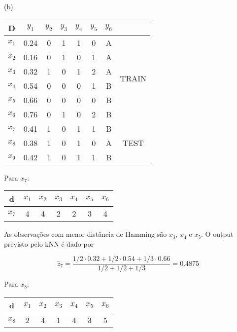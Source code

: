 \documentclass[a4paper,12pt]{article} %
\begin{document}
\begin{enumerate}
\begin{table}[H]
\end{table}

(b)

\begin{table}[H]
    \centering
    \begin{tabular}{cccccccc}
    D  & $y_1$   & $y_2$ & $y_3$ & $y_4$ & $y_5$ & $y_6$ &         \\ \hline
    $x_1$ & 0.24 & 0  & 1  & 1  & 0  & A  & \multirow{6}{*}{TRAIN} \\
    $x_2$ & 0.16 & 0  & 1  & 0  & 1  & A  &                        \\
    $x_3$ & 0.32 & 1  & 0  & 1  & 2  & A  &                        \\
    $x_4$ & 0.54 & 0  & 0  & 0  & 1  & B  &                        \\
    $x_5$ & 0.66 & 0  & 0  & 0  & 0  & B  &                        \\
    $x_6$ & 0.76 & 0  & 1  & 0  & 2  & B  &                        \\ \hline
    $x_7$ & 0.41 & 1  & 0  & 1  & 1  & B  & \multirow{3}{*}{TEST}  \\
    $x_8$ & 0.38 & 1  & 0  & 1  & 0  & A  &                        \\
    $x_9$ & 0.42 & 1  & 0  & 1  & 1  & B  &                       
    \end{tabular}
\end{table}

Para $x_7$:

\begin{table}[H]
    \centering
    \begin{tabular}{c|cccccc}
    d      & $x_1$ & $x_2$ & $x_3$ & $x_4$ & $x_5$ & $x_6$ \\ \hline
    $x_7$  & 4     & 4     & 2     & 2     & 3     & 4    
    \end{tabular}
    \end{table}

As observações com menor distância de Hamming são $x_3$, $x_4$ e $x_5$. O output previsto pelo kNN é dado por 

\begin{equation*}
    \hat{z}_{7} = \frac{1/2 \cdot 0.32 + 1/2 \cdot 0.54 + 1/3 \cdot 0.66}{1/2 + 1/2 + 1/3} = 0.4875
\end{equation*}

Para $x_8$:

\begin{table}[H]
    \centering
    \begin{tabular}{c|cccccc}
    d      & $x_1$ & $x_2$ & $x_3$ & $x_4$ & $x_5$ & $x_6$ \\ \hline
    $x_8$  & 2     & 4     & 1     & 4     & 3     & 5    
    \end{tabular}
    \end{table}


\end{enumerate}
\end{document}

